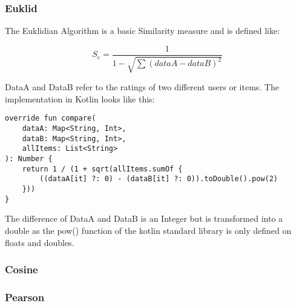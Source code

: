 \subsubsection{Euklid}

The Euklidian Algorithm is a basic Similarity measure and is defined like:

\begin{equation}
S_{e} = \frac{1}{1-\sqrt{\sum{(dataA - dataB)^2}}}
\label{euklid}
\end{equation}

DataA and DataB refer to the ratings of two different users or items.
The implementation in Kotlin looks like this:

\begin{verbatim}
override fun compare(
    dataA: Map<String, Int>,
    dataB: Map<String, Int>,
    allItems: List<String>
): Number {
    return 1 / (1 + sqrt(allItems.sumOf { 
        ((dataA[it] ?: 0) - (dataB[it] ?: 0)).toDouble().pow(2) 
    }))
}
\end{verbatim}

The difference of DataA and DataB is an Integer but is transformed into a double as the pow() function of the kotlin standard library is only defined on floats and doubles.

\subsubsection{Cosine}

\subsubsection{Pearson}